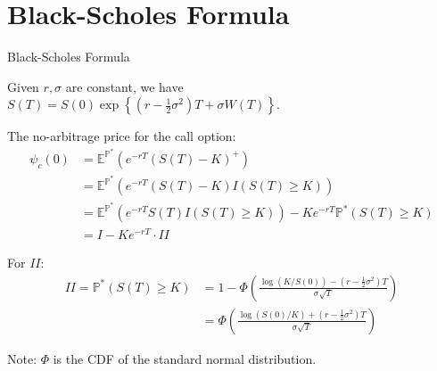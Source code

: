 \documentclass{beamer}
\begin{document}
\section{Black-Scholes Formula}
\begin{frame}{Black-Scholes Formula}


    {\footnotesize \footnotesize
    \par Given $r, \sigma$ are constant, we have $S(T) = S(0) \exp\left\{(r - \tfrac{1}{2} \sigma^2) T + \sigma W(T)\right\}$.
    \vspace{1em}
    \par The no-arbitrage price for the call option:
    \begin{align*}
        \psi_c(0)& = \mathbb{E}^{\mathbb{P}^*}(e^{-rT}(S(T) - K)^+)\\&= \mathbb{E}^{\mathbb{P}^*}(e^{-rT}(S(T) - K)I(S(T) \geq K)) \\
        &= \mathbb{E}^{\mathbb{P}^*}(e^{-rT}S(T)I(S(T) \geq K)) - Ke^{-rT}\mathbb{P}^*(S(T) \geq K)\\& = I - Ke^{-rT} \cdot II \
    \end{align*}
    \par For $II$:
    \begin{align*}
        II = \mathbb{P}^*(S(T) \geq K) &= 1 - \Phi \left( \frac{\log(K/S(0)) - (r - \frac{1}{2}\sigma^2)T}{\sigma\sqrt{T}} \right) \\
        &= \Phi \left( \frac{\log(S(0)/K) + (r - \frac{1}{2}\sigma^2)T}{\sigma\sqrt{T}} \right)
    \end{align*}
    \par Note: $\Phi$ is the CDF of the standard normal distribution.
    }
\end{frame}
\end{document}
